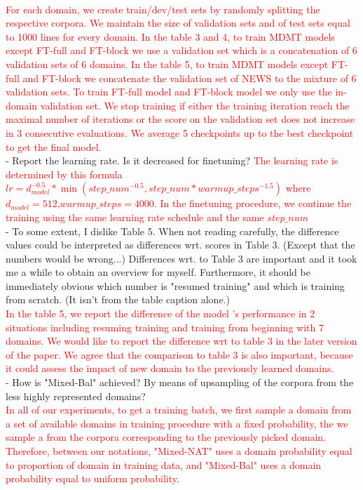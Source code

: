 \documentclass[12pt,times,a4paper,twoside]{article}
\theoremstyle{definition}
\begin{document}
\\
\textcolor{red}{For each domain, we create train/dev/test sets by randomly splitting the respective corpora. We maintain the size of validation sets and of test sets equal to 1000 lines for every domain. In the table 3 and 4, to train MDMT models except FT-full and FT-block we use a validation set which is a concatenation of 6 validation sets of 6 domains. In the table 5, to train MDMT models except FT-full and FT-block we concatenate the validation set of NEWS to the mixture of 6 validation sets. To train FT-full model and FT-block model we only use the in-domain validation set. We stop training if either the training iteration reach the maximal number of iterations or the score on the validation set does not increase in 3 consecutive evaluations. We average 5 checkpoints up to the best checkpoint to get the final model.}
\\
- Report the learning rate. Is it decreased for finetuning?
\textcolor{red}{The learning rate is determined by this formula $lr = d_{model}^{-0.5}*\min(step\_num^{-0.5},step\_num * warmup\_steps^{-1.5})$ where $d_{model}=512$,$warmup\_steps=4000$. In the finetuning procedure, we continue the training using the same learning rate schedule and the same $step\_num$}
\\
- To some extent, I dislike Table 5. When not reading carefully, the
difference values could be interpreted as differences wrt. scores in Table 3. (Except that the numbers would be wrong...) Differences wrt. to Table 3 are important and it took me a while to obtain an overview for myself. Furthermore, it should be immediately obvious which number is "resumed training" and which is training from scratch. (It isn't from the table caption alone.)
\\
\textcolor{red}{In the table 5, we report the difference of the model 's performance in 2 situations including resuming training and training from beginning with 7 domains. We would like to report the difference wrt to table 3 in the later version of the paper. We agree that the comparison to table 3 is also important, because it could assess the impact of new domain to the previously learned domains.}
\\
- How is "Mixed-Bal" achieved? By means of upsampling of the corpora from the less highly represented domains?
\\
\textcolor{red}{In all of our experiments, to get a training batch, we first sample a domain from a set of available domains in training procedure with a fixed probability, the we sample a from the corpora corresponding to the previously picked domain. Therefore, between our notations, "Mixed-NAT" uses a domain probability equal to proportion of domain in training data, and "Mixed-Bal" uses a domain probability equal to uniform probability.}
\end{document}
